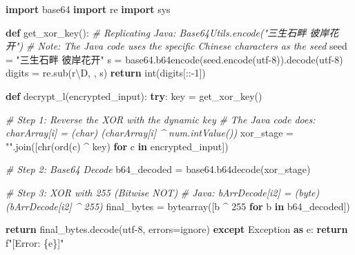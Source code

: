\documentclass[
]{article}
\newenvironment{Shaded}{}{}
\newcommand{\BuiltInTok}[1]{\textcolor[rgb]{0.00,0.50,0.00}{#1}}
\newcommand{\CommentTok}[1]{\textcolor[rgb]{0.38,0.63,0.69}{\textit{#1}}}
\newcommand{\ControlFlowTok}[1]{\textcolor[rgb]{0.00,0.44,0.13}{\textbf{#1}}}
\newcommand{\DecValTok}[1]{\textcolor[rgb]{0.25,0.63,0.44}{#1}}
\newcommand{\ImportTok}[1]{\textcolor[rgb]{0.00,0.50,0.00}{\textbf{#1}}}
\newcommand{\KeywordTok}[1]{\textcolor[rgb]{0.00,0.44,0.13}{\textbf{#1}}}
\newcommand{\NormalTok}[1]{#1}
\newcommand{\OperatorTok}[1]{\textcolor[rgb]{0.40,0.40,0.40}{#1}}
\newcommand{\PreprocessorTok}[1]{\textcolor[rgb]{0.74,0.48,0.00}{#1}}
\newcommand{\SpecialCharTok}[1]{\textcolor[rgb]{0.25,0.44,0.63}{#1}}
\newcommand{\SpecialStringTok}[1]{\textcolor[rgb]{0.73,0.40,0.53}{#1}}
\newcommand{\StringTok}[1]{\textcolor[rgb]{0.25,0.44,0.63}{#1}}
\newcommand{\VerbatimStringTok}[1]{\textcolor[rgb]{0.25,0.44,0.63}{#1}}
\begin{document}
\begin{Shaded}
\begin{Highlighting}[]
\ImportTok{import}\NormalTok{ base64}
\ImportTok{import}\NormalTok{ re}
\ImportTok{import}\NormalTok{ sys}

\KeywordTok{def}\NormalTok{ get\_xor\_key():}
    \CommentTok{\# Replicating Java: Base64Utils.encode("三生石畔 彼岸花开")}
    \CommentTok{\# Note: The Java code uses the specific Chinese characters as the seed}
\NormalTok{    seed }\OperatorTok{=} \StringTok{"三生石畔 彼岸花开"}
\NormalTok{    s }\OperatorTok{=}\NormalTok{ base64.b64encode(seed.encode(}\StringTok{\textquotesingle{}utf{-}8\textquotesingle{}}\NormalTok{)).decode(}\StringTok{\textquotesingle{}utf{-}8\textquotesingle{}}\NormalTok{)}
\NormalTok{    digits }\OperatorTok{=}\NormalTok{ re.sub(}\VerbatimStringTok{r\textquotesingle{}}\DecValTok{\textbackslash{}D}\VerbatimStringTok{\textquotesingle{}}\NormalTok{, }\StringTok{\textquotesingle{}\textquotesingle{}}\NormalTok{, s)}
    \ControlFlowTok{return} \BuiltInTok{int}\NormalTok{(digits[::}\OperatorTok{{-}}\DecValTok{1}\NormalTok{])}

\KeywordTok{def}\NormalTok{ decrypt\_l(encrypted\_input):}
    \ControlFlowTok{try}\NormalTok{:}
\NormalTok{        key }\OperatorTok{=}\NormalTok{ get\_xor\_key()}

        \CommentTok{\# Step 1: Reverse the XOR with the dynamic key}
        \CommentTok{\# The Java code does: charArray[i] = (char) (charArray[i] \^{} num.intValue())}
\NormalTok{        xor\_stage }\OperatorTok{=} \StringTok{""}\NormalTok{.join([}\BuiltInTok{chr}\NormalTok{(}\BuiltInTok{ord}\NormalTok{(c) }\OperatorTok{\^{}}\NormalTok{ key) }\ControlFlowTok{for}\NormalTok{ c }\KeywordTok{in}\NormalTok{ encrypted\_input])}

        \CommentTok{\# Step 2: Base64 Decode}
\NormalTok{        b64\_decoded }\OperatorTok{=}\NormalTok{ base64.b64decode(xor\_stage)}

        \CommentTok{\# Step 3: XOR with 255 (Bitwise NOT)}
        \CommentTok{\# Java: bArrDecode[i2] = (byte) (bArrDecode[i2] \^{} 255)}
\NormalTok{        final\_bytes }\OperatorTok{=} \BuiltInTok{bytearray}\NormalTok{([b }\OperatorTok{\^{}} \DecValTok{255} \ControlFlowTok{for}\NormalTok{ b }\KeywordTok{in}\NormalTok{ b64\_decoded])}

        \ControlFlowTok{return}\NormalTok{ final\_bytes.decode(}\StringTok{\textquotesingle{}utf{-}8\textquotesingle{}}\NormalTok{, errors}\OperatorTok{=}\StringTok{\textquotesingle{}ignore\textquotesingle{}}\NormalTok{)}
    \ControlFlowTok{except} \PreprocessorTok{Exception} \ImportTok{as}\NormalTok{ e:}
        \ControlFlowTok{return} \SpecialStringTok{f"[Error: }\SpecialCharTok{\{}\NormalTok{e}\SpecialCharTok{\}}\SpecialStringTok{]"}


\end{Highlighting}
\end{Shaded}
\end{document}
